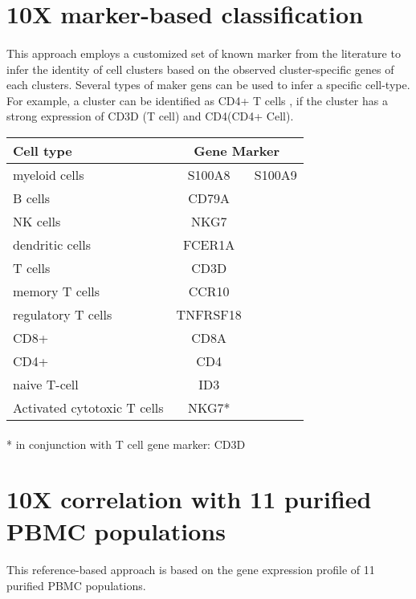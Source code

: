 \documentclass{article}
\begin{document}
\section*{10X marker-based classification}
\paragraph{}
This approach employs a customized set of known marker from the literature to infer the identity of cell clusters  based on the observed cluster-specific genes of each clusters. Several types of maker gens can be used to infer a specific cell-type. For example, a cluster can be identified as CD4+ T cells , if the cluster has a strong expression of CD3D (T cell) and CD4(CD4+ Cell). \\ 
\par
\begin{tabular}{ |l|c |r| }
\hline
Cell type&\multicolumn{2}{|c|}{Gene Marker} \\ \hline
myeloid cells&S100A8&S100A9 \\ \hline
B cells	&CD79A&\\ \hline	
NK cells&NKG7&\\	\hline
dendritic cells&FCER1A&\\ \hline	
T cells&CD3D&\\	\hline
memory T cells&CCR10&\\	\hline
regulatory T cells&TNFRSF18&\\ \hline	
CD8+&CD8A&\\	\hline
CD4+&CD4&\\	\hline
naive T-cell&ID3& \\	\hline
Activated cytotoxic T cells&NKG7*& \\ 	
\hline
\end{tabular}
\paragraph{}
* in conjunction with T cell gene marker: CD3D 
\section*{10X correlation with 11 purified PBMC populations}
\paragraph{}
This reference-based approach is based on the gene expression profile of 11 purified PBMC populations.
\end{document}
